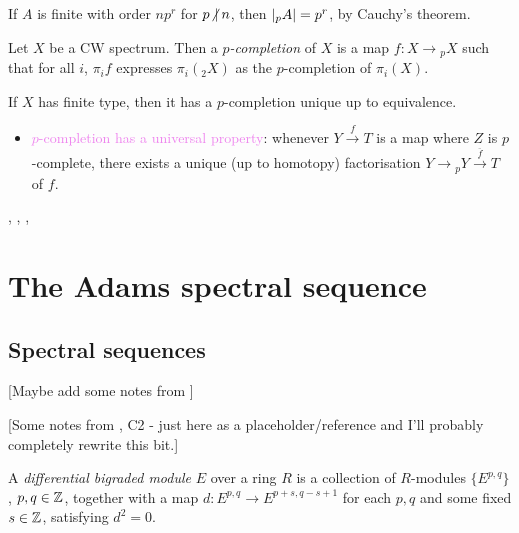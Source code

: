 \documentclass{MetricNotes2023}
\def\inte{\ensuremath\mathbb{Z}}
\def\textcolour{\textcolor}
\def\nvert{\ensuremath\hspace{-0.5ex}\not\vert\hspace{0.5ex}}
\begin{document}
\begin{remark}
If \(A\) is finite with order \(np^r\) for \(p\nvert n\), then \(\lvert\text{}_pA\rvert=p^r\), by Cauchy's theorem. 
\end{remark}

\begin{definition}
Let \(X\) be a CW spectrum. Then a \textit{\(p\)-completion} of \(X\) is a map \(f : X \to \text{}_pX\) such that for all \(i\), \(\pi_if\) expresses \(\pi_i(\text{}_2X)\) as the \(p\)-completion of \(\pi_i(X)\).
\end{definition}

\begin{theorem}
If \(X\) has finite type, then it has a \(p\)-completion unique up to equivalence. 
\end{theorem}

\begin{itemize}
\item \textcolour{violet}{\(p\)-completion has a universal property}: whenever \(Y \xrightarrow{f} T\) is a map where \(Z\) is \(p\)-complete, there exists a unique (up to homotopy) factorisation \(Y\to \text{}_pY \xrightarrow{\overline f} T\) of \(f\). 
\end{itemize}

\autocite{ass}, \autocite{hatcher5}, \autocite{concise}, \autocite{spectra}

\section{The Adams spectral sequence}

\subsection{Spectral sequences}\label{2504041910}

[Maybe add some notes from \autocite{ass}]

[Some notes from \autocite{spectral_sequences}, C2 - just here as a placeholder/reference and I'll probably completely rewrite this bit.]

\begin{definition}
A \textit{differential bigraded module} \(E\) over a ring \(R\) is a collection of \(R\)-modules \(\{E^{p, q}\}\), \(p, q\in \inte\), together with a map \(d : E^{p, q} \to E^{p+s, q-s+1}\) for each \(p, q\) and some fixed \(s \in \inte\), satisfying \(d^2=0\). 
\end{definition}
\end{document}
